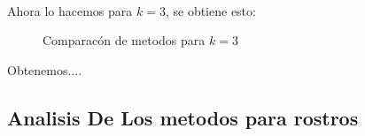 \\
Ahora lo hacemos para $k=3$, se obtiene esto:
\begin{figure}[H]
    \centering
    \qquad
    \qquad
    \caption{Comparacón de metodos para $k = 3$}%
    \label{fig:example}%
\end{figure}

Obtenemos....



\subsection{Analisis De Los metodos para rostros}

